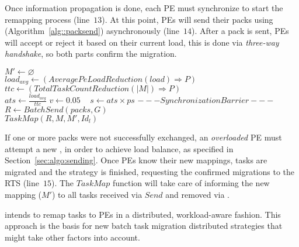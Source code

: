 Once information propagation is done, each PE must synchronize to start the remapping process (line~$13$). 
At this point, PEs will send their packs using \batchsend (Algorithm~\ref{alg::packsend}) asynchronously (line~$14$).
After a pack is sent, PEs will accept or reject it based on their current load, this is done via \textit{three-way handshake}, so both parts confirm the migration.

\begin{algorithm}[t]
	\DontPrintSemicolon
    $  M' \gets \varnothing$\\
    $load_{avg} \gets (AveragePeLoadReduction(load)\Rightarrow  P)$ \\
    $ttc \gets (TotalTaskCountReduction(|M|)\Rightarrow  P)$\\
    $ats\gets \frac{load_{avg}}{ttc}$ \qquad\qquad\qquad {}
    $v \gets 0.05$ \qquad \qquad\ 
    $s \gets ats\times ps$ \qquad\qquad\qquad\qquad\qquad {}
    $---Synchronization Barrier---$\\
    $R \gets BatchSend(packs, G)$\\
    $TaskMap(R,M, M',Id_{l})$
    \caption{\packdrop}
    \label{alg::packdrop}    
\end{algorithm}

If one or more packs were not successfully exchanged, an \textit{overloaded} PE must attempt a new \batchsend, in order to achieve load balance, as specified in Section~\ref{sec:algo:sending}.
Once PEs know their new mappings, tasks are migrated and the strategy is finished, requesting the confirmed migrations to the RTS (line~$15$). 
The $TaskMap$ function will take care of informing the new mapping ($M'$) to all tasks received via $Send$ and removed via \batchsend.

\packdrop intends to remap tasks to PEs in a distributed, workload-aware fashion.
This approach is the basis for new batch task migration distributed strategies that might take other factors into account.